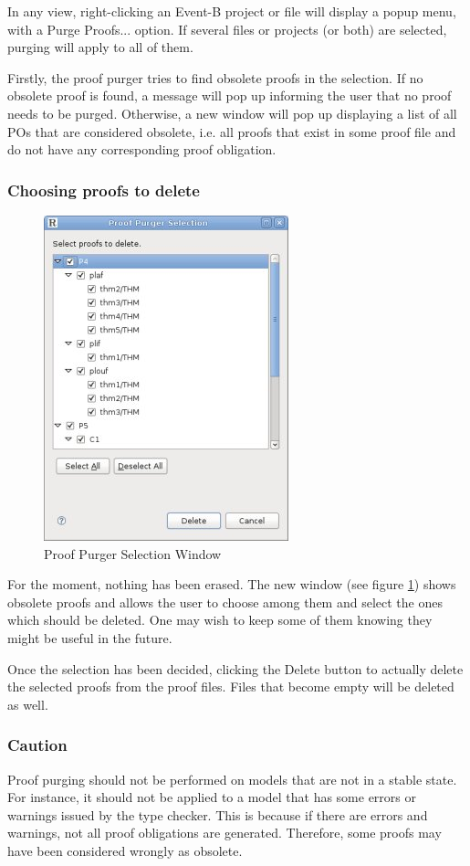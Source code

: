 In any view, right-clicking an Event-B project or file will display a popup menu, with a \textsf{Purge Proofs...} option. If several files or projects (or both) are selected, purging will apply to all of them.

Firstly, the proof purger tries to find obsolete proofs in the selection. If no obsolete proof is found, a message will pop up informing the user that no proof needs to be purged. Otherwise, a new window will pop up displaying a list of all POs that are considered obsolete, i.e. all proofs that exist in some proof file and do not have any corresponding proof obligation. 

\subsubsection{Choosing proofs to delete}

\begin{figure}[!h]
\begin{center}
	\includegraphics{img/reference/ref_10_proof_purger.png}
	\caption{Proof Purger Selection Window}
	\label{fig_ref_10_proof_purger}
\end{center}
\end{figure}

For the moment, nothing has been erased. The new window (see figure \ref{fig_ref_10_proof_purger}) shows obsolete proofs and allows the user to choose among them and select the ones which should be deleted. One may wish to keep some of them knowing they might be useful in the future.

Once the selection has been decided, clicking the Delete button to actually delete the selected proofs from the proof files. Files that become empty will be deleted as well.

\subsubsection{Caution}

Proof purging should not be performed on models that are not in a stable state. For instance, it should not be applied to a model that has some errors or warnings issued by the type checker. This is because if there are errors and warnings, not all proof obligations are generated. Therefore, some proofs may have been considered wrongly as obsolete.
